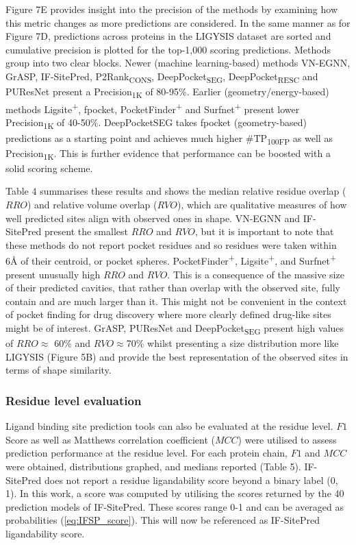 Figure 7E provides insight into the precision of the methods by examining how this metric changes as more predictions are considered. In the same manner as for Figure 7D, predictions across proteins in the LIGYSIS dataset are sorted and cumulative precision is plotted for the top-1,000 scoring predictions. Methods group into two clear blocks. Newer (machine learning-based) methods VN-EGNN, GrASP, IF-SitePred, P2Rank\textsubscript{CONS}, DeepPocket\textsubscript{SEG}, DeepPocket\textsubscript{RESC} and PUResNet present a Precision\textsubscript{1K} of 80-95\%. Earlier (geometry/energy-based) methods Ligsite\textsuperscript{+}, fpocket, PocketFinder\textsuperscript{+} and Surfnet\textsuperscript{+} present lower Precision\textsubscript{1K} of 40-50\%. DeepPocketSEG takes fpocket (geometry-based) predictions as a starting point and achieves much higher \#TP\textsubscript{100FP} as well as Precision\textsubscript{1K}. This is further evidence that performance can be boosted with a solid scoring scheme.

Table 4 summarises these results and shows the median relative residue overlap ($RRO$) and relative volume overlap ($RVO$), which are qualitative measures of how well predicted sites align with observed ones in shape. VN-EGNN and IF-SitePred present the smallest $RRO$ and $RVO$, but it is important to note that these methods do not report pocket residues and so residues were taken within 6Å of their centroid, or pocket spheres. PocketFinder\textsuperscript{+}, Ligsite\textsuperscript{+}, and Surfnet\textsuperscript{+} present unusually high $RRO$ and $RVO$. This is a consequence of the massive size of their predicted cavities, that rather than overlap with the observed site, fully contain and are much larger than it. This might not be convenient in the context of pocket finding for drug discovery where more clearly defined drug-like sites might be of interest. GrASP, PUResNet and DeepPocket\textsubscript{SEG} present high values of $RRO \approx$ 60\% and $RVO \approx $70\% whilst presenting a size distribution more like LIGYSIS (Figure 5B) and provide the best representation of the observed sites in terms of shape similarity.

\subsubsection{Residue level evaluation}

Ligand binding site prediction tools can also be evaluated at the residue level. $F1$ Score as well as Matthews correlation coefficient ($MCC$) were utilised to assess prediction performance at the residue level. For each protein chain, $F1$ and $MCC$ were obtained, distributions graphed, and medians reported (Table 5). IF-SitePred does not report a residue ligandability score beyond a binary label (0, 1). In this work, a score was computed by utilising the scores returned by the 40 prediction models of IF-SitePred. These scores range 0-1 and can be averaged as probabilities (\autoref{eq:IFSP_score}). This will now be referenced as IF-SitePred ligandability score.


